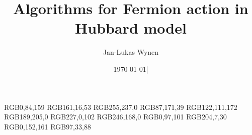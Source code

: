 
\usepackage[a4paper,
            vdivide={3.3cm,,3.3cm},
            hdivide={2cm,,2cm}
            ]{geometry}

\usepackage{ucs}                %
\usepackage[utf8x]{inputenc}
\usepackage[T1]{fontenc}
\usepackage[english]{babel}

\usepackage{amsmath}
\usepackage{amsfonts}
\usepackage{amssymb}
\usepackage{amsthm}
\usepackage{mathtools}
\usepackage{commath}            %
\usepackage{bm}                 %
\usepackage{dsfont}

\usepackage{datetime}
\usepackage{authblk}
\usepackage{picinpar}           %
\usepackage{graphics}           %
\usepackage{float}              %
\usepackage{caption}
\usepackage{subcaption}
\usepackage{cite}
\usepackage{placeins}           %
\usepackage[dvipsnames,hyperref]{xcolor}
\usepackage{tcolorbox}
\usepackage[colorinlistoftodos]{todonotes}
\usepackage[pdftex, ocgcolorlinks]{hyperref}
\usepackage{cleveref}


\newcommand{\theauthor}{Jan-Lukas Wynen}
\newcommand{\theinstitute}{IAS-4}
\newcommand{\thetitle}{Algorithms for Fermion action in Hubbard model}
\newcommand{\thedate}{\isodate\today}


\author[1]{\theauthor}

\title{\thetitle}
\date{\thedate|\currenttime}

\definecolor{rwthblau}     {RGB}{0,84,159}
\definecolor{rwthbordeaux} {RGB}{161,16,53}
\definecolor{rwthgelb}     {RGB}{255,237,0}
\definecolor{rwthgrun}     {RGB}{87,171,39}
\definecolor{rwthlila}     {RGB}{122,111,172}
\definecolor{rwthmaigrun}  {RGB}{189,205,0}
\definecolor{rwthmagenta}  {RGB}{227,0,102}
\definecolor{rwthorange}   {RGB}{246,168,0}
\definecolor{rwthpetrol}   {RGB}{0,97,101}
\definecolor{rwthrot}      {RGB}{204,7,30}
\definecolor{rwthturkis}   {RGB}{0,152,161}
\definecolor{rwthviolett}  {RGB}{97,33,88}

